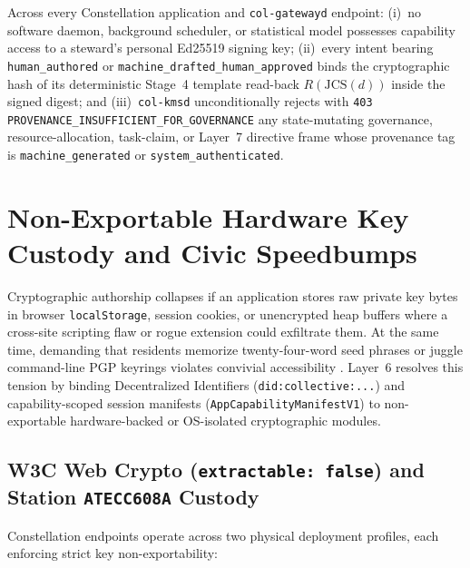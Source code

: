 \begin{invariant}
\label{inv:human-authorship}
Across every Constellation application and \texttt{col-gatewayd} endpoint: (i)~no software daemon, background scheduler, or statistical model possesses capability access to a steward's personal Ed25519 signing key; (ii)~every intent bearing \texttt{human\_authored} or \texttt{machine\_drafted\_human\_approved} binds the cryptographic hash of its deterministic Stage~4 template read-back $R(\mathrm{JCS}(d))$ inside the signed digest; and (iii)~\texttt{col-kmsd} unconditionally rejects with \texttt{403 PROVENANCE\_INSUFFICIENT\_FOR\_GOVERNANCE} any state-mutating governance, resource-allocation, task-claim, or Layer~7 directive frame whose provenance tag is \texttt{machine\_generated} or \texttt{system\_authenticated}.
\end{invariant}

\section{Non-Exportable Hardware Key Custody and Civic Speedbumps}
\label{sec:hardware-custody-speedbumps}

Cryptographic authorship collapses if an application stores raw private key bytes in browser \texttt{localStorage}, session cookies, or unencrypted heap buffers where a cross-site scripting flaw or rogue extension could exfiltrate them. At the same time, demanding that residents memorize twenty-four-word seed phrases or juggle command-line PGP keyrings violates convivial accessibility \parencite{illich1973,costanzachock2020design}. Layer~6 resolves this tension by binding Decentralized Identifiers (\texttt{did:collective:...}) \parencite{w3c2022did} and capability-scoped session manifests (\texttt{AppCapabilityManifestV1}) \parencite{miller2006robust} to non-exportable hardware-backed or OS-isolated cryptographic modules.

\subsection{W3C Web Crypto (\texttt{extractable: false}) and Station \texttt{ATECC608A} Custody}
\label{subsec:key-custody}

Constellation endpoints operate across two physical deployment profiles, each enforcing strict key non-exportability:

